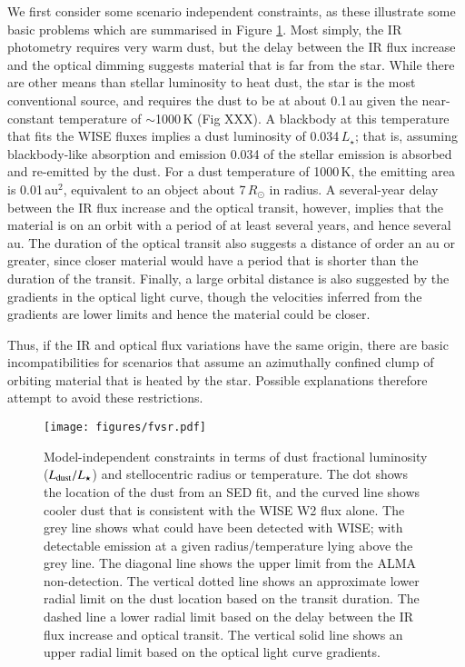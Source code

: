 \documentclass{aa}
\begin{document}
We first consider some scenario independent constraints, as these illustrate some basic problems which are summarised in Figure \ref{fig:constr}.
%
Most simply, the IR photometry requires very warm dust, but the delay between the IR flux increase and the optical dimming suggests material that is far from the star.
%
While there are other means than stellar luminosity to heat dust, the star is the most conventional source, and requires the dust to be at about 0.1\,au given the near-constant temperature of $\sim$1000\,K (Fig XXX). A blackbody at this temperature that fits the WISE fluxes implies a dust luminosity of 0.034\,$L_\star$; that is, assuming blackbody-like absorption and emission 0.034 of the stellar emission is absorbed and re-emitted by the dust. For a dust temperature of 1000\,K, the emitting area is 0.01\,au$^2$, equivalent to an object about 7\,$R_\odot$ in radius.
%
A several-year delay between the IR flux increase and the optical transit, however, implies that the material is on an orbit with a period of at least several years, and hence several au.
%
The duration of the optical transit also suggests a distance of order an au or greater, since closer material would have a period that is shorter than the duration of the transit.
%
Finally, a large orbital distance is also suggested by the gradients in the optical light curve, though the velocities inferred from the gradients are lower limits and hence the material could be closer.

Thus, if the IR and optical flux variations have the same origin, there are basic incompatibilities for scenarios that assume an azimuthally confined clump of orbiting material that is heated by the star.
%
Possible explanations therefore attempt to avoid these restrictions.

\begin{figure}
    \centering
    \texttt{[image: figures/fvsr.pdf]}
    \caption{Model-independent constraints in terms of dust fractional luminosity ($L_{\rm dust}/L_\star$) and stellocentric radius or temperature.
    The dot shows the location of the dust from an SED fit, and the curved line shows cooler dust that is consistent with the WISE W2 flux alone. The grey line shows what could have been detected with WISE; with detectable emission at a given radius/temperature lying above the grey line.
    The diagonal line shows the upper limit from the ALMA non-detection.
    The vertical dotted line shows an approximate lower radial limit on the dust location based on the transit duration.
    The dashed line a lower radial limit based on the delay between the IR flux increase and optical transit.
    The vertical solid line shows an upper radial limit based on the optical light curve gradients.}
    \label{fig:constr}
\end{figure}
\end{document}
